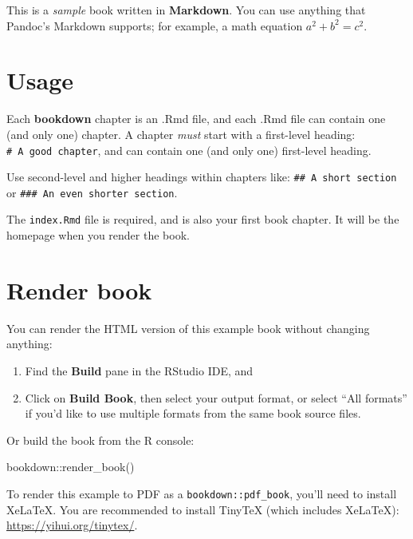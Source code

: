 \documentclass[
]{book}
\newenvironment{Shaded}{\begin{snugshade}}{\end{snugshade}}
\newcommand{\FunctionTok}[1]{\textcolor[rgb]{0.00,0.00,0.00}{#1}}
\newcommand{\NormalTok}[1]{#1}
\newcommand{\SpecialCharTok}[1]{\textcolor[rgb]{0.00,0.00,0.00}{#1}}
\theoremstyle{definition}
\theoremstyle{definition}
\theoremstyle{definition}
\theoremstyle{definition}
\theoremstyle{remark}
\begin{document}
This is a \emph{sample} book written in \textbf{Markdown}. You can use anything that Pandoc's Markdown supports; for example, a math equation \(a^2 + b^2 = c^2\).

\hypertarget{usage}{%
\section{Usage}\label{usage}}

Each \textbf{bookdown} chapter is an .Rmd file, and each .Rmd file can contain one (and only one) chapter. A chapter \emph{must} start with a first-level heading: \texttt{\#\ A\ good\ chapter}, and can contain one (and only one) first-level heading.

Use second-level and higher headings within chapters like: \texttt{\#\#\ A\ short\ section} or \texttt{\#\#\#\ An\ even\ shorter\ section}.

The \texttt{index.Rmd} file is required, and is also your first book chapter. It will be the homepage when you render the book.

\hypertarget{render-book}{%
\section{Render book}\label{render-book}}

You can render the HTML version of this example book without changing anything:

\begin{enumerate}
\def\labelenumi{\arabic{enumi}.}
\item
  Find the \textbf{Build} pane in the RStudio IDE, and
\item
  Click on \textbf{Build Book}, then select your output format, or select ``All formats'' if you'd like to use multiple formats from the same book source files.
\end{enumerate}

Or build the book from the R console:

\begin{Shaded}
\begin{Highlighting}[]
\NormalTok{bookdown}\SpecialCharTok{::}\FunctionTok{render\_book}\NormalTok{()}
\end{Highlighting}
\end{Shaded}

To render this example to PDF as a \texttt{bookdown::pdf\_book}, you'll need to install XeLaTeX. You are recommended to install TinyTeX (which includes XeLaTeX): \url{https://yihui.org/tinytex/}.
\end{document}
